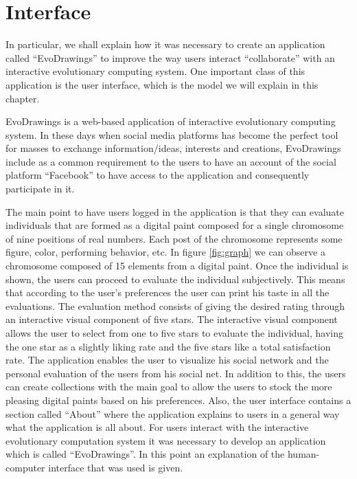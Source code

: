 \section{Interface}
In particular, we shall explain how it was necessary to create an application called “EvoDrawings” to improve the way users interact “collaborate” with an interactive evolutionary computing system. One important class of this application is the user interface, which is the model we will explain in this chapter.

EvoDrawings is a web-based application of interactive evolutionary computing system. In these days when social media platforms has become the perfect tool for masses to exchange information/ideas, interests and creations, EvoDrawings include as a common requirement to the users to have an account of the social platform “Facebook” to have access to the application and consequently participate in it.

The main point to have users logged in the application is that they can evaluate individuals that are formed as a digital paint composed for a single chromosome of nine positions of real numbers.
Each post of the chromosome represents some figure, color, performing behavior, etc. In figure \ref{fig:graph} we can observe a chromosome composed of 15 elements from a digital paint. Once the individual is shown, the users can proceed to evaluate the individual subjectively. This means that according to the user's preferences the user can print his taste in all the evaluations.
The evaluation method consists of giving the desired rating through an interactive visual component of five stars. The interactive visual component allows the user to select from one to five stars to evaluate the individual, having the one star as a slightly liking rate and the five stars like a total satisfaction rate. 
The application enables the user to visualize his social network and the personal evaluation of the users from his social net. In addition to this, the users can create collections with the main goal to allow the users to stock the more pleasing digital paints based on his preferences. 
Also, the user interface contains a section called “About” where the application explains to users in a general way what the application is all about.
For users interact with the interactive evolutionary computation system  it was necessary to develop an application which is called “EvoDrawings”. In this point an explanation of the human-computer interface that was used  is given. 

